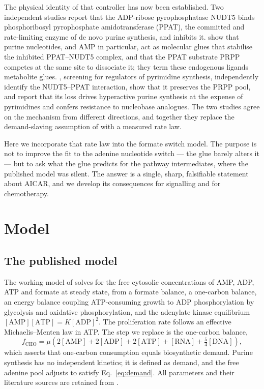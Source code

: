 \documentclass[a4paper,fleqn]{cas-sc}
\begin{document}
The physical identity of that controller has now been established. Two
independent studies report that the ADP-ribose pyrophosphatase NUDT5 binds
phosphoribosyl pyrophosphate amidotransferase (PPAT), the committed and
rate-limiting enzyme of de novo purine synthesis, and inhibits it.
\citet{witus2026} show that purine nucleotides, and AMP in particular, act as
molecular glues that stabilise the inhibited PPAT--NUDT5 complex, and that the
PPAT substrate PRPP competes at the same site to dissociate it; they term these
endogenous ligands metabolite glues. \citet{strefeler2025}, screening for
regulators of pyrimidine synthesis, independently identify the NUDT5--PPAT
interaction, show that it preserves the PRPP pool, and report that its loss
drives hyperactive purine synthesis at the expense of pyrimidines and confers
resistance to nucleobase analogues. The two studies agree on the mechanism from
different directions, and together they replace the demand-slaving assumption of
\citet{oizel2020} with a measured rate law.

Here we incorporate that rate law into the formate switch model. The purpose is
not to improve the fit to the adenine nucleotide switch --- the glue barely
alters it --- but to ask what the glue predicts for the pathway intermediates,
where the published model was silent. The answer is a single, sharp, falsifiable
statement about AICAR, and we develop its consequences for signalling and for
chemotherapy.

\section{Model}

\subsection{The published model}

The working model of \citet{oizel2020} solves for the free cytosolic
concentrations of AMP, ADP, ATP and formate at steady state, from a formate
balance, a one-carbon balance, an energy balance coupling ATP-consuming growth to
ADP phosphorylation by glycolysis and oxidative phosphorylation, and the
adenylate kinase equilibrium $[\mathrm{AMP}][\mathrm{ATP}]=K[\mathrm{ADP}]^2$.
The proliferation rate follows an effective Michaelis--Menten law in ATP. The
step we replace is the one-carbon balance,
\begin{equation}
f_{\mathrm{CHO}} = \mu\left(2[\mathrm{AMP}]+2[\mathrm{ADP}]+2[\mathrm{ATP}]
+[\mathrm{RNA}]+\tfrac{5}{4}[\mathrm{DNA}]\right),
\label{eq:demand}
\end{equation}
which asserts that one-carbon consumption equals biosynthetic demand. Purine
synthesis has no independent kinetics; it is defined as demand, and the free
adenine pool adjusts to satisfy Eq.~\eqref{eq:demand}. All parameters and their
literature sources are retained from \citet{oizel2020}.
\end{document}
